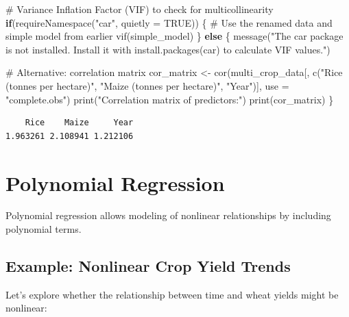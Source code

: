\documentclass[
  letterpaper,
]{book}
\newenvironment{Shaded}{\begin{snugshade}}{\end{snugshade}}
\newcommand{\AttributeTok}[1]{\textcolor[rgb]{0.40,0.45,0.13}{#1}}
\newcommand{\CommentTok}[1]{\textcolor[rgb]{0.37,0.37,0.37}{#1}}
\newcommand{\ConstantTok}[1]{\textcolor[rgb]{0.56,0.35,0.01}{#1}}
\newcommand{\ControlFlowTok}[1]{\textcolor[rgb]{0.00,0.23,0.31}{\textbf{#1}}}
\newcommand{\FunctionTok}[1]{\textcolor[rgb]{0.28,0.35,0.67}{#1}}
\newcommand{\NormalTok}[1]{\textcolor[rgb]{0.00,0.23,0.31}{#1}}
\newcommand{\OtherTok}[1]{\textcolor[rgb]{0.00,0.23,0.31}{#1}}
\newcommand{\StringTok}[1]{\textcolor[rgb]{0.13,0.47,0.30}{#1}}
\begin{document}
\begin{Shaded}
\begin{Highlighting}[]
\CommentTok{\# Variance Inflation Factor (VIF) to check for multicollinearity}
\ControlFlowTok{if}\NormalTok{(}\FunctionTok{requireNamespace}\NormalTok{(}\StringTok{"car"}\NormalTok{, }\AttributeTok{quietly =} \ConstantTok{TRUE}\NormalTok{)) \{}
  \CommentTok{\# Use the renamed data and simple model from earlier}
  \FunctionTok{vif}\NormalTok{(simple\_model)}
\NormalTok{\} }\ControlFlowTok{else}\NormalTok{ \{}
  \FunctionTok{message}\NormalTok{(}\StringTok{"The \textquotesingle{}car\textquotesingle{} package is not installed. Install it with install.packages(\textquotesingle{}car\textquotesingle{}) to calculate VIF values."}\NormalTok{)}
  
  \CommentTok{\# Alternative: correlation matrix}
\NormalTok{  cor\_matrix }\OtherTok{\textless{}{-}} \FunctionTok{cor}\NormalTok{(multi\_crop\_data[, }\FunctionTok{c}\NormalTok{(}\StringTok{"Rice (tonnes per hectare)"}\NormalTok{, }\StringTok{"Maize (tonnes per hectare)"}\NormalTok{, }\StringTok{"Year"}\NormalTok{)], }\AttributeTok{use =} \StringTok{"complete.obs"}\NormalTok{)}
  \FunctionTok{print}\NormalTok{(}\StringTok{"Correlation matrix of predictors:"}\NormalTok{)}
  \FunctionTok{print}\NormalTok{(cor\_matrix)}
\NormalTok{\}}
\end{Highlighting}
\end{Shaded}

\begin{verbatim}
    Rice    Maize     Year 
1.963261 2.108941 1.212106 
\end{verbatim}

\section{Polynomial Regression}\label{polynomial-regression}

Polynomial regression allows modeling of nonlinear relationships by
including polynomial terms.

\subsection{Example: Nonlinear Crop Yield
Trends}\label{example-nonlinear-crop-yield-trends}

Let's explore whether the relationship between time and wheat yields
might be nonlinear:
\end{document}
